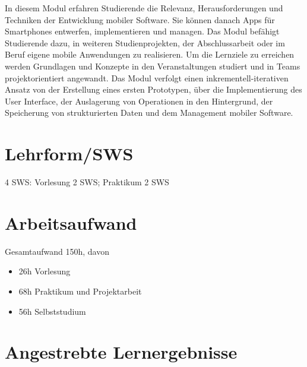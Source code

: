 In diesem Modul erfahren Studierende die Relevanz, Herausforderungen und
Techniken der Entwicklung mobiler Software. Sie können danach Apps für
Smartphones entwerfen, implementieren und managen. Das Modul befähigt
Studierende dazu, in weiteren Studienprojekten, der Abschlussarbeit oder
im Beruf eigene mobile Anwendungen zu realisieren. Um die Lernziele zu
erreichen werden Grundlagen und Konzepte in den Veranstaltungen studiert
und in Teams projektorientiert angewandt. Das Modul verfolgt einen
inkrementell-iterativen Ansatz von der Erstellung eines ersten
Prototypen, über die Implementierung des User Interface, der Auslagerung
von Operationen in den Hintergrund, der Speicherung von strukturierten
Daten und dem Management mobiler Software.

\hypertarget{lehrformswspathlabel....srcmodulbeschreibungen-bachelor-bpo5ba_mobile-computing}{%
\section*{Lehrform/SWS\label{../../src/modulbeschreibungen-bachelor-bpo5/BA_Mobile-Computing}}\label{lehrformswspathlabel....srcmodulbeschreibungen-bachelor-bpo5ba_mobile-computing}}

4 SWS: Vorlesung 2 SWS; Praktikum 2 SWS

\hypertarget{arbeitsaufwandpathlabel....srcmodulbeschreibungen-bachelor-bpo5ba_mobile-computing}{%
\section*{Arbeitsaufwand\label{../../src/modulbeschreibungen-bachelor-bpo5/BA_Mobile-Computing}}\label{arbeitsaufwandpathlabel....srcmodulbeschreibungen-bachelor-bpo5ba_mobile-computing}}

Gesamtaufwand 150h, davon

\begin{itemize}
\tightlist
\item
  26h Vorlesung
\item
  68h Praktikum und Projektarbeit
\item
  56h Selbststudium
\end{itemize}

\hypertarget{angestrebte-lernergebnissepathlabel....srcmodulbeschreibungen-bachelor-bpo5ba_mobile-computing}{%
\section*{Angestrebte
Lernergebnisse\label{../../src/modulbeschreibungen-bachelor-bpo5/BA_Mobile-Computing}}\label{angestrebte-lernergebnissepathlabel....srcmodulbeschreibungen-bachelor-bpo5ba_mobile-computing}}

